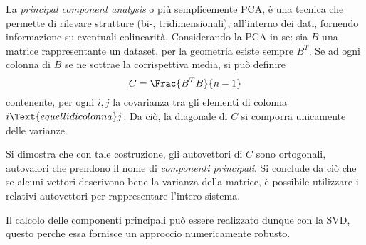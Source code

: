 \documentclass{subfiles}
\begin{document}
La \emph{principal component analysis} o più semplicemente PCA, è una tecnica che permette di rilevare strutture (bi-, tridimensionali),
all'interno dei dati, fornendo informazione su eventuali colinearità.
Considerando la PCA in se: sia \(B\) una matrice rappresentante un dataset, per la geometria esiste sempre \(B^{T}\).
Se ad ogni colonna di \(B\) se ne sottrae la corrispettiva media, si può definire
\[
    C = \Frac{B^{T} B}{n - 1}
\]
contenente, per ogni \(i, j\) la covarianza tra gli elementi di colonna \(i \Text{e quelli di colonna} j\).
Da ciò, la diagonale di \(C\) si comporra unicamente delle varianze.

Si dimostra che con tale costruzione, gli autovettori di \(C\) sono ortogonali, autovalori che prendono il nome di \emph{componenti principali}.
Si conclude da ciò che se alcuni vettori descrivono bene la varianza della matrice, è possibile utilizzare i relativi autovettori per rappresentare l'intero sistema.
\begin{Remark*}
    Il calcolo delle componenti principali può essere realizzato dunque con la SVD, questo perche essa fornisce un approccio numericamente robusto.
\end{Remark*}
\end{document}
